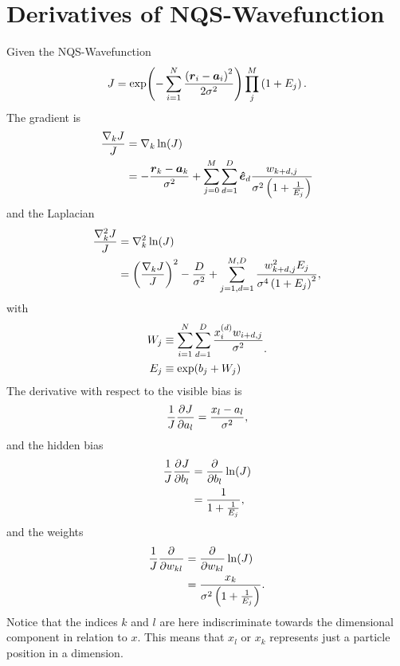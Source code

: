 \section{Derivatives of NQS-Wavefunction}
    Given the NQS-Wavefunction
        \begin{equation}
            J = \exp(-\suml{i=1}{N} \frac{\left(\blds{r}_i -
            \blds{a}_i\right)^2}{2\sigma^2})\prod\limits^{M}_j \left(1 +
            E_j\right).
        \end{equation}
    The gradient is
        \begin{align}
            \frac{\nabla_k J}{J} &= \nabla_k \ln(J) \nonumber \\
            &= -\frac{\blds{r}_k - \blds{a}_k}{\sigma^2} +
            \suml{j=0}{M}\suml{d=1}{D} \blds{\hat{e}}_d
            \frac{w_{k+d,j}}{\sigma^2\left(1 + \frac{1}{E_j}\right)}
        \end{align}
    and the Laplacian
        \begin{align}
            \frac{\nabla^2_k J}{J} &= \nabla^2_k \ln(J) \nonumber \\ &=
            \left(\frac{\nabla_k J}{J}\right)^2- \frac{D}{\sigma^2} +
            \suml{j=1,d=1}{M,D} \frac{w^2_{k+d,j}E_j}{\sigma^4\left(1 +
            E_j\right)^2},
        \end{align}
    with 
        \begin{equation}
            \begin{aligned}
                W_j &\equiv \suml{i=1}{N}\suml{d=1}{D}
                \frac{x^{(d)}_iw_{i+d,j}}{\sigma^2} \\
                E_j &\equiv \exp(b_j + W_j)
            \end{aligned}.
        \end{equation}
    The derivative with respect to the visible bias is
        \begin{equation}
            \frac{1}{J}\prd{a_l}[J] = \frac{x_l - a_l}{\sigma^2},
        \end{equation}
    and the hidden bias
        \begin{align}
            \frac{1}{J}\prd{b_l}[J] &= \prd{b_l}\ln(J) \nonumber \\
            &= \frac{1}{1 + \frac{1}{E_j}},
        \end{align}
    and the weights
        \begin{align}
            \frac{1}{J}\prd{w_{kl}} &= \prd{w_{kl}}\ln(J) \nonumber \\
            &= \frac{x_k}{\sigma^2\left(1 + \frac{1}{E_j}\right)}.
        \end{align}
    Notice that the indices $k$ and $l$ are here indiscriminate towards the
    dimensional component in relation to $x$. This means that $x_l$ or $x_k$
    represents just a particle position in a dimension.

